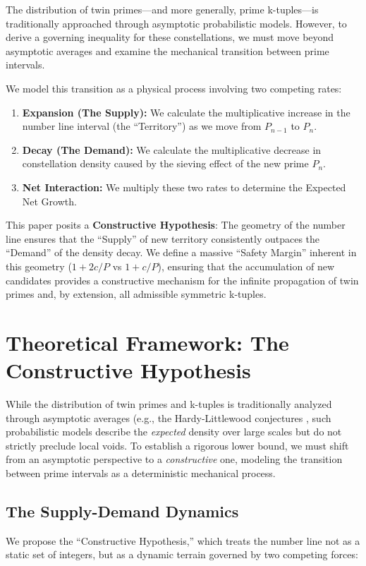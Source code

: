 \documentclass[sn-mathphys-num, pdflatex]{sn-jnl}
\begin{document}
The distribution of twin primes—and more generally, prime k-tuples—is traditionally approached through asymptotic probabilistic models. However, to derive a governing inequality for these constellations, we must move beyond asymptotic averages and examine the mechanical transition between prime intervals.

We model this transition as a physical process involving two competing rates:
\begin{enumerate}
    \item \textbf{Expansion (The Supply):} We calculate the multiplicative increase in the number line interval (the ``Territory'') as we move from $P_{n-1}$ to $P_{n}$.
    \item \textbf{Decay (The Demand):} We calculate the multiplicative decrease in constellation density caused by the sieving effect of the new prime $P_{n}$.
    \item \textbf{Net Interaction:} We multiply these two rates to determine the Expected Net Growth.
\end{enumerate}

This paper posits a \textbf{Constructive Hypothesis}: The geometry of the number line ensures that the ``Supply'' of new territory consistently outpaces the ``Demand'' of the density decay. We define a massive ``Safety Margin'' inherent in this geometry ($1+2c/P$ vs $1+c/P$), ensuring that the accumulation of new candidates provides a constructive mechanism for the infinite propagation of twin primes and, by extension, all admissible symmetric k-tuples.

\section{Theoretical Framework: The Constructive Hypothesis}

While the distribution of twin primes and k-tuples is traditionally analyzed through asymptotic averages (e.g., the Hardy-Littlewood conjectures \cite{Hardy1923}, such probabilistic models describe the \textit{expected} density over large scales but do not strictly preclude local voids. To establish a rigorous lower bound, we must shift from an asymptotic perspective to a \textit{constructive} one, modeling the transition between prime intervals as a deterministic mechanical process.

\subsection{The Supply-Demand Dynamics}
We propose the ``Constructive Hypothesis,'' which treats the number line not as a static set of integers, but as a dynamic terrain governed by two competing forces:
\end{document}
